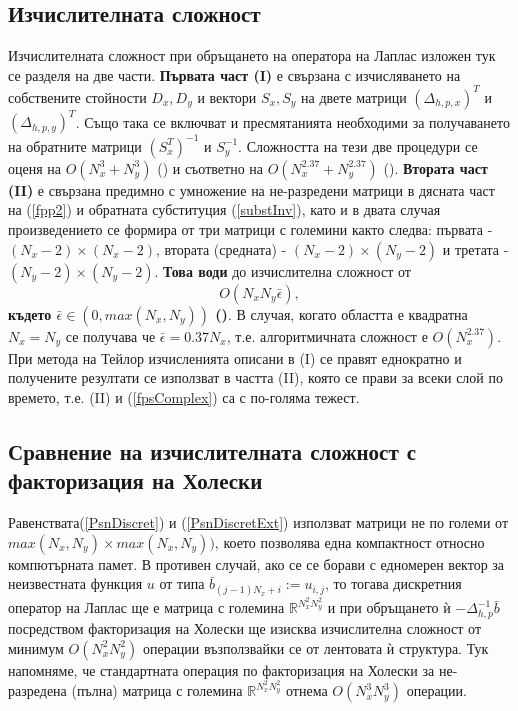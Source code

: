 \documentclass{article}
\newcommand{\be}{\begin{equation}}
\newcommand{\ee}{\end{equation}}
\newcommand{\rf}[1]{(\ref{#1})}
\newcommand{\RR}{\mathbb{R}}
\begin{document}
\subsection{Изчислителната сложност}
Изчислителната сложност при обръщането на оператора на Лаплас изложен тук се разделя на две части. \textbf{ Първата част (I)} е свързана с изчисляването на собствените стойности $D_x, D_y$ и вектори $S_x, S_y$ на двете матрици $(\Delta_{h,p,x})^T$ и $(\Delta_{h,p,y})^T$. Също така се включват и пресмятанията необходими за получаването на обратните матрици $(S_x^T)^{-1}$ и $S_y^{-1}$. Сложността на тези две процедури се оценя на $O(N_x^3+N_y^3)$ (\cite{ref260}) и съответно на $O(N_x^{2.37}+N_y^{2.37})$ (\cite{ref27}). \textbf{Втората част (II)} е свързана предимно с умножение на не-разредени матрици в дясната част на \rf{fpp2} и обратната субституция \rf{substInv}, като и в двата случая произведението се формира от три матрици  с големини както следва: първата - $(N_x-2) \times (N_x-2)$, втората (средната) - $(N_x-2) \times (N_y-2)$ и третата - $(N_y-2) \times (N_y-2)$. \textbf{Това води} до изчислителна сложност от 
\be\label{fpsComplex}
O(N_x N_y \bar{\epsilon}),
\ee
\textbf{където $\bar{\epsilon} \in (0, max(N_x, N_y))$ (\cite{ref26, ref27})}. В случая, когато областта е квадратна $N_x = N_y$ се получава че $\bar{\epsilon} = 0.37 N_x$, т.е. алгоритмичната сложност е $O(N_x^{2.37})$. При метода на Тейлор изчисленията описани в (I) се правят еднократно и получените резултати се използват в частта (II), която се прави за всеки слой по времето, т.е. (II) и \rf{fpsComplex} са с по-голяма тежест. 

\subsection{Сравнение на изчислителната сложност с факторизация на Холески}
Равенствата\rf{PsnDiscret} и \rf{PsnDiscretExt} използват матрици не по големи от $max(N_x, N_y) \times max(N_x, N_y))$, което позволява една компактност относно компютърната памет. В противен случай, ако се се борави с едномерен вектор за неизвестната функция $u$ от типа $\bar {b}_{(j-1)N_x + i} := u_{i,j}$, то тогава дискретния оператор на Лаплас ще е матрица с големина $\RR^{N_x^2 N_y^2}$ и при обръщането ѝ $-\Delta_{h,p}^{-1}\bar {b}$ посредством факторизация на Холески ще изисква изчислителна сложност от минимум $O(N_x^2 N_y^2)$ операции възползвайки се от лентовата ѝ структура. Тук напомняме, че стандартната операция по факторизация на Холески за не-разредена (пълна) матрица с големина $\RR^{N_x^2 N_y^2}$ отнема $O(N_x^3 N_y^3)$ операции.
\end{document}
